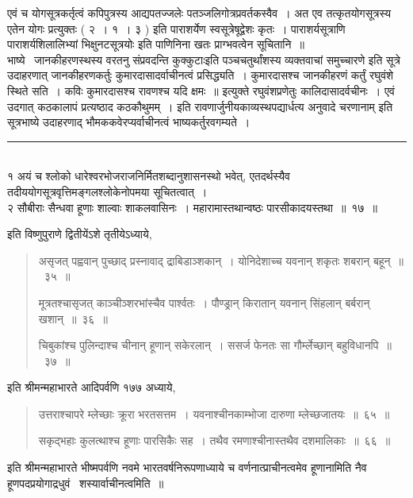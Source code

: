\documentclass[11pt, openany]{book}
\begin{document}
एवं च योगसूत्रकर्तृत्वं कपिपुत्रस्य आद्यपतज्जलेः पतञ्जलिगोत्रप्रवर्तकस्वैव~। अत एव तत्कृतयोगसूत्रस्य {\qt एतेन योगः प्रत्युक्तः ( २~। १~। ३ ) इति पाराशर्येण स्वसूत्रेषूद्वेशः कृतः~। पाराशर्यसूत्राणि }पाराशर्यशिलालिभ्यां भिक्षुनटसूत्रयोः इति पाणिनिना खतः प्राग्भवत्वेन सूचितानि~॥\\

भाष्ये \textendash\ जानकीहरणस्थस्य {\qt वरतनु संप्रवदन्ति कुक्कुटाःइति पञ्चचतुर्थांशस्य व्यक्तवाचां समुच्चारणे} इति सूत्रे उदाहरणात् जानकीहरणकर्तुः कुमारदासादर्वाचीनत्वं प्रसिद्ध्यति~। {\qt कुमारदासश्च} जानकीहरणं कर्तुं रघुवंशे स्थिते सति~। कविः कुमारदासश्च रावणश्च यदि क्षमः~॥ इत्युक्ते रघुवंशप्रणेतुः कालिदासादर्वचीनः~। एवं {\qt उदगात् कठकालापं प्रत्यष्ठाद कठकौथुमम्~। } इति रावणार्जुनीयकाव्यस्थपद्यार्धत्य {\qt अनुवादे चरणानाम्} इति सूत्रभाष्ये उदाहरणाद् भौमककवेरप्यर्वाचीनत्वं भाष्यकर्तुरवगम्यते~।

\noindent
\rule{1\linewidth}{0.5pt}\\

१ अयं च श्लोको धारेश्वरभोजराजनिर्मितशब्दानुशासनस्थो भवेत्, एतदर्थस्यैव तदीययोगसूत्रवृत्तिमङ्गलश्लोकेनोपमया सूचितत्वात्~।\\

२ {\qt सौबीराः सैन्धवा हूणाः शाल्वाः शाकलवासिनः~। महारामास्तथान्वष्ठः पारसीकादयस्तथा~॥~१७~॥}

इति विष्णुपुराणे द्वितीयेंऽशे तृतीयेऽध्याये,

\begin{quote}
{\qt असृजत् पह्ववान् पुच्छाद् प्रस्नावाद् द्राबिडाञ्शकान्~। योनिदेशाच्च यवनान् शकृतः शबरान् बहून्~॥~३५~॥

मूत्रतश्चासृजत् काञ्चीञ्शरभांस्चैव पार्श्वतः~। पौण्ड्रान् किरातान् यवनान् सिंहलान् बर्बरान् खशान्~॥~३६~॥

चिबुकांश्च पुलिन्दाश्च चीनान् हूणान् सकेरलान्~। ससर्ज फेनतः सा गौर्म्लेच्छान् बहुविधानपि~॥~३७~॥}
\end{quote}

 इति श्रीमन्महाभारते आदिपर्वणि १७७ अध्याये, 

\begin{quote}
{\qt उत्तराश्चापरे म्लेच्छाः क्रूरा भरतसत्तम~। यवनाश्चीनकाम्भोजा दारुणा म्लेच्छजातयः~॥~६५~॥

सकृद्भहाः कुलत्थाश्च हूणाः पारसिकैः सह~। तथैव रमणाश्चीनास्तथैव दशमालिकाः~॥~६६~॥}
\end{quote}

इति श्रीमन्महाभारते भीष्मपर्वणि नवमे भारतवर्षनिरूपणाध्याये च वर्णनात्प्राचीनत्वमेव हूणानामिति नैव हूणपदप्रयोगाद्रधुवं \textendash\ शस्यार्वाचीनत्वमिति~॥
\end{document}
